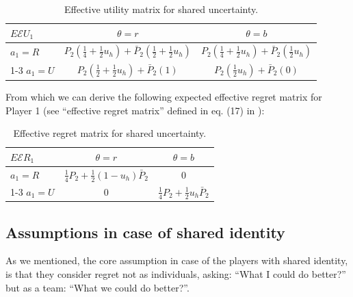 \documentclass{article}
\theoremstyle{definition}
\begin{document}
\begin{table}[H]
    \label{tab:EffectiveUtilitySharedIdentity}
\begin{center}
\renewcommand{\arraystretch}{1.3} %
\begin{tabular}{| l|c c|}
\hline
\multirow{1}{*}{$E\mathcal{E}U_1$} & $\theta=r$  & $\theta=b$\\
\hline
  $a_1=R$ &
  $P_2(\frac{1}{4} +  \frac{1}{2} u_h) + \bar{P}_2 (\frac{1}{2} + \frac{1}{2} u_h)$ &
  $P_2(\frac{1}{4} +  \frac{1}{2} u_h) + \bar{P}_2 (\frac{1}{2} u_h)$\\
\cline{1-3}
  $a_1=U$ &
  $P_2(\frac{1}{2} + \frac{1}{2} u_h)+\bar{P}_2(1)$ &
  $P_2(\frac{1}{2} u_h) + \bar{P}_2 (0)$\\
\hline
\end{tabular}
\caption{Effective utility matrix for shared uncertainty.}
\end{center}
\end{table}

From which we can derive the following expected effective regret matrix for Player 1 (see ``effective regret matrix'' defined in eq. (17) in \cite{arxiv:ExtendedEquilibrium}):

\begin{table}[H]
\begin{center}
\renewcommand{\arraystretch}{1.3} %
\begin{tabular}{| l|c c|}
\hline
\multirow{1}{*}{$E\mathcal{E}R_1$} & $\theta=r$  & $\theta=b$\\
\hline
  $a_1=R$ &
  $\frac{1}{4} P_2 + \frac{1}{2}(1-u_h) \bar{P}_2$ & 
  $0$\\
\cline{1-3}
  $a_1=U$ &
  $0$ & 
  $\frac{1}{4} P_2 + \frac{1}{2} u_h \bar{P}_2$\\
\hline
\end{tabular}
\caption{Effective regret matrix for shared uncertainty.}
    \label{tab:EffectiveRegretSharedUncertainty}
\end{center}
\end{table}

\subsection{Assumptions in case of shared identity}

As we mentioned, the core assumption in case of the players with shared identity, is that they consider regret not as individuals, asking: ``What I could do better?'' but as a team: ``What we could do better?''.
\end{document}
